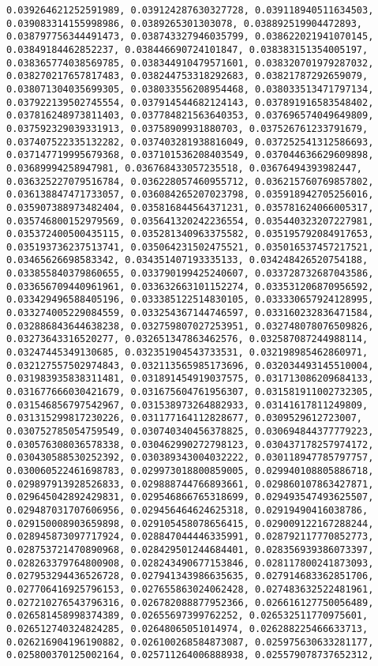 \documentclass[11pt]{article}
\begin{document}
\begin{Verbatim}[commandchars=\\\{\}]
0.039264621252591989, 0.039124287630327728, 0.039118940511634503, 0.039083314155998986, 0.0389265301303078, 0.038892519904472893, 0.038797756344491473, 0.038743327946035799, 0.038622021941070145, 0.03849184462852237, 0.038446690724101847, 0.038383151354005197, 0.038365774038569785, 0.038344910479571601, 0.038320701979287032, 0.038270217657817483, 0.038244753318292683, 0.03821787292659079, 0.038071304035699305, 0.038033556208954468, 0.038033513471797134, 0.037922139502745554, 0.037914544682124143, 0.037891916583548402, 0.037816248973811403, 0.037784821563640353, 0.037696574049649809, 0.037592329039331913, 0.03758909931880703, 0.037526761233791679, 0.037407522335132282, 0.037403281938816049, 0.037252541312586693, 0.037147719995679368, 0.037101536208403549, 0.037044636629609898, 0.03689994258947981, 0.036768433057235518, 0.03676494393982447, 0.036325227079516784, 0.036228057460955712, 0.036215760769857802, 0.036138847471733057, 0.036084265207023798, 0.035918942705256016, 0.035907388973482404, 0.035816844564371231, 0.035781624066005317, 0.035746800152979569, 0.035641320242236554, 0.035440323207227981, 0.035372400500435115, 0.035281340963375582, 0.035195792084917653, 0.035193736237513741, 0.035064231502475521, 0.035016537457217521, 0.03465626698583342, 0.034351407193335133, 0.034248426520754188, 0.033855840379860655, 0.033790199425240607, 0.033728732687043586, 0.033656709440961961, 0.033632663101152274, 0.033531206870956592, 0.033429496588405196, 0.033385122514830105, 0.033330657924128995, 0.033274005229084559, 0.033254367144746597, 0.033160232836471584, 0.032886843644638238, 0.032759807027253951, 0.032748078076509826, 0.03273643316520277, 0.032651347863462576, 0.032587087244988114, 0.03247445349130685, 0.032351904543733531, 0.032198985462860971, 0.032127557502974843, 0.032113565985173696, 0.032034493145510004, 0.031983935838311481, 0.031891454919037575, 0.031713086209684133, 0.031677666030421679, 0.031675604761956307, 0.031581911002732305, 0.031546856797542967, 0.031538973264882933, 0.03141617811249809, 0.031315299817230226, 0.031177164112828677, 0.0309529612723007, 0.030752785054759549, 0.030740340456378825, 0.030694844377779223, 0.030576308036578338, 0.030462990272798123, 0.030437178257974172, 0.030430588530252392, 0.030389343004032222, 0.030118947785797757, 0.030060522461698783, 0.029973018800859005, 0.029940108805886718, 0.029897913928526833, 0.029888744766893661, 0.029860107863427871, 0.029645042892429831, 0.029546866765318699, 0.029493547493625507, 0.029487031707606956, 0.029456464624625318, 0.02919490416038786, 0.029150008903659898, 0.029105458078656415, 0.029009122167288244, 0.028945873097717924, 0.028847044446335991, 0.028792117770852773, 0.028753721470890968, 0.028429501244684401, 0.028356939386073397, 0.028263379764800908, 0.028243490677153846, 0.028117800241873093, 0.027953294436526728, 0.027941343986635635, 0.027914683362851706, 0.027706416925796153, 0.027655863024062428, 0.027483632522481961, 0.027210276543796316, 0.026782088877952366, 0.026616127750056489, 0.026581458998374389, 0.02655697399762252, 0.026532511770975601, 0.026512740324824285, 0.02648065051014974, 0.026288225466633713, 0.026216904196190882, 0.026100268584873087, 0.025975630633281177, 0.025800370125002164, 0.025711264006888938, 0.025579078737652312, 
\end{Verbatim}
\end{document}
